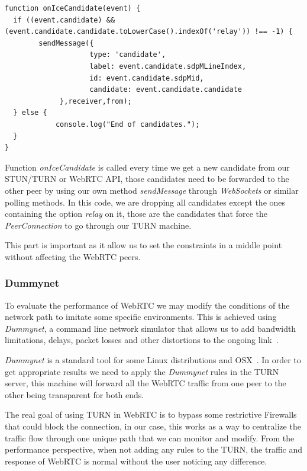 \lstset{language=JavaScript}
\begin{lstlisting}[caption=Dropping all candidates except relay]
function onIceCandidate(event) {
  if ((event.candidate) && (event.candidate.candidate.toLowerCase().indexOf('relay')) !== -1) {
		sendMessage({
               		type: 'candidate',
               		label: event.candidate.sdpMLineIndex,
               		id: event.candidate.sdpMid,
               		candidate: event.candidate.candidate
          	 },receiver,from);
  } else {
           	console.log("End of candidates.");
  }
}
\end{lstlisting}

Function {\it onIceCandidate} is called every time we get a new candidate from our STUN/TURN or WebRTC API, those candidates need to be forwarded to the other peer by using our own method {\it sendMessage} through {\it WebSockets} or similar polling methods. In this code, we are dropping all candidates except the ones containing the option {\it relay} on it, those are the candidates that force the {\it PeerConnection} to go through our TURN machine.

This part is important as it allow us to set the constraints in a middle point without affecting the WebRTC peers.

\subsubsection{Dummynet}

To evaluate the performance of WebRTC we may modify the conditions of the network path to imitate some specific environments. This is achieved using {\it Dummynet}, a command line network simulator that allows us to add bandwidth limitations, delays, packet losses and other distortions to the ongoing link~\cite{dummynetTool}.

{\it Dummynet} is a standard tool for some Linux distributions and OSX~\cite{dummynetTool}. In order to get appropriate results we need to apply the {\it Dummynet} rules in the TURN server, this machine will forward all the WebRTC traffic from one peer to the other being transparent for both ends. 

The real goal of using TURN in WebRTC is to bypass some restrictive Firewalls that could block the connection, in our case, this works as a way to centralize the traffic flow through one unique path that we can monitor and modify. From the performance perspective, when not adding any rules to the TURN, the traffic and response of WebRTC is normal without the user noticing any difference.

